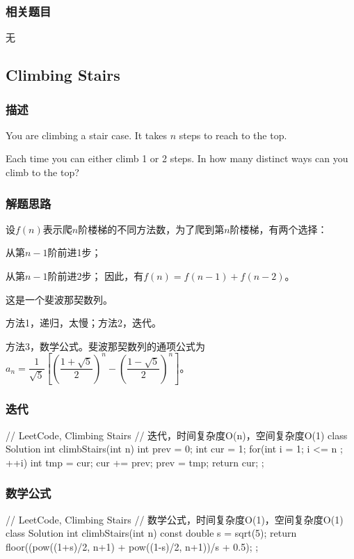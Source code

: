 \subsubsection{相关题目}
\begindot
\item 无
\myenddot


\subsection{Climbing Stairs} %
\label{sec:climbing-stairs}


\subsubsection{描述}
You are climbing a stair case. It takes $n$ steps to reach to the top.

Each time you can either climb 1 or 2 steps. In how many distinct ways can you 
climb to the top?


\subsubsection{解题思路}
设$f(n)$表示爬$n$阶楼梯的不同方法数，为了爬到第$n$阶楼梯，有两个选择：
\begindot
\item 从第$n-1$阶前进1步；
\item 从第$n-1$阶前进2步；
\myenddot
因此，有$f(n)=f(n-1)+f(n-2)$。

这是一个斐波那契数列。

方法1，递归，太慢；方法2，迭代。

方法3，数学公式。斐波那契数列的通项公式为 
$a_n=\dfrac{1}{\sqrt{5}}\left[\left(\dfrac{1+\sqrt{5}}{2}\right)^n-\left(\dfrac{1-\sqrt{5}}{2}\right)^n\right]$。


\subsubsection{迭代}
\begin{Code}
	// LeetCode, Climbing Stairs
	// 迭代，时间复杂度O(n)，空间复杂度O(1)
	class Solution {
		int climbStairs(int n) {
			int prev = 0;
			int cur = 1;
			for(int i = 1; i <= n ; ++i){
				int tmp = cur;
				cur += prev;
				prev = tmp;
			}
			return cur;
		}
	};
\end{Code}


\subsubsection{数学公式}
\begin{Code}
	// LeetCode, Climbing Stairs
	// 数学公式，时间复杂度O(1)，空间复杂度O(1)
	class Solution {
		int climbStairs(int n) {
			const double s = sqrt(5);
			return floor((pow((1+s)/2, n+1) + pow((1-s)/2, n+1))/s + 0.5);
		}
	};
\end{Code}


